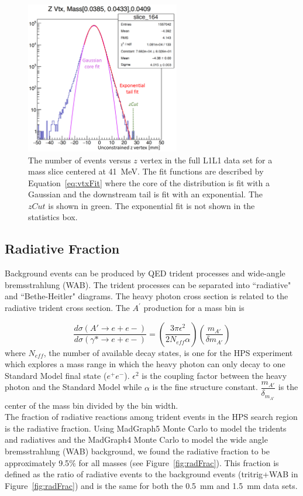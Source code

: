 \begin{figure}[htb]
  \centering
      \includegraphics[width=0.6\textwidth]{pics/searching/vtxFit.png}
  \caption[Fit to vertex slice at a mass of 41~MeV]{The number of events versus $z$ vertex in the full L1L1 data set for a mass slice centered at 41~MeV. The fit functions are described by Equation~\eqref{eq:vtxFit} where the core of the distribution is fit with a Gaussian and the downstream tail is fit with an exponential. The $zCut$ is shown in green. The exponential fit is not shown in the statistics box.}
  \label{fig:vtxFitPic}
\end{figure} 


\subsection{Radiative Fraction}
Background events can be produced by QED trident processes and wide-angle bremsstrahlung (WAB). The trident processes can be separated into ``radiative" and ``Bethe-Heitler" diagrams. The heavy photon cross section is related to the radiative trident cross section. The $A^{\prime}$ production for a mass bin is

\begin{equation}
\label{eq:crossSection}
\dfrac{d\sigma(A'\rightarrow e+e-)}{d\sigma(\gamma*\rightarrow e+e-)} = \left(\dfrac{3\pi\epsilon^{2}}{2N_{eff}\alpha}\right)\left(\dfrac{m_{A'}}{\delta m_{A'}}\right)
\end{equation}
where $N_{eff}$, the number of available decay states, is one for the HPS experiment which explores a mass range in which the heavy photon can only decay to one Standard Model final state ($e^+e^-$). $\epsilon^{2}$ is the coupling factor between the heavy photon and the Standard Model while $\alpha$ is the fine structure constant. $\dfrac{m_{A'}}{\delta_{m_{A'}}}$ is the center of the mass bin divided by the bin width. \\%
\indent The fraction of radiative reactions among trident events in the HPS search region is the radiative fraction. Using MadGraph5 Monte Carlo to model the tridents and radiatives and the MadGraph4 Monte Carlo to model the wide angle bremsstrahlung (WAB) background, we found the radiative fraction to be approximately 9.5$\%$ for all masses (see Figure~\ref{fig:radFrac}). This fraction is defined as the ratio of radiative events to the background events (tritrig+WAB in Figure~\ref{fig:radFrac}) and is the same for both the 0.5~mm and 1.5~mm data sets.

